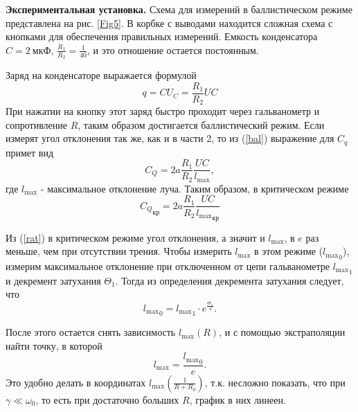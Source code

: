 \documentclass[12pt,a4paper]{article}
\begin{document}
\textbf{Экспериментальная установка.} Схема для измерений в баллистическом режиме представлена на рис. \ref{Fig5}. В корбке с выводами находится сложная схема с кнопками для обеспечения правильных измерений. Емкость конденсатора $C = 2~\text{мкФ}$, $\frac{R_1}{R_2} = \frac{1}{40}$, и это отношение остается постоянным.

Заряд на конденсаторе выражается формулой 
\begin{equation}
q = CU_C = \frac{R_1}{R_2}UC
\end{equation}
При нажатии на кнопку этот заряд быстро проходит через гальванометр и сопротивление $R$, таким образом достигается баллистический режим. Если измерят угол отклонения так же, как и в части 2, то из (\ref{bal}) выражение для $C_q$ примет вид
\begin{equation}
C_Q = 2a\frac{R_1}{R_2}\frac{UC}{l_\text{max}},
\end{equation}
где $l_\text{max}$ - максимальное отклонение луча. Таким образом, в критическом режиме
\begin{equation}
{C_Q}_\text{кр} = 2a\frac{R_1}{R_2}\frac{UC}{{l_\text{max}}_\text{кр}}\label{cqcr}
\end{equation}

Из (\ref{rat}) в критическом режиме угол отклонения, а значит и $l_\text{max}$, в $e$ раз меньше, чем при отсутствии трения. Чтобы измерить $l_\text{max}$ в этом режиме (${l_\text{max}}_0$), измерим максимальное отклонение при отключенном от цепи гальванометре ${l_\text{max}}_1$ и декремент затухания $\Theta_1$. Тогда из определения декремента затухания следует, что
\begin{equation}
{l_\text{max}}_0 = {l_\text{max}}_1\cdot e^{\frac{\Theta_1}{4}}.\label{lmax0}
\end{equation}

После этого остается снять зависимость $l_\text{max}(R)$, и с помощью экстраполяции найти точку, в которой
\begin{equation}
l_\text{max} = \frac{{l_\text{max}}_0}{e}.
\end{equation}
Это удобно делать в координатах $l_\text{max}\left(\frac{1}{R+R_0}\right)$, т.к. несложно показать, что при $\gamma \ll \omega_0$, то есть при достаточно больших $R$, график в них линеен.
\end{document}
